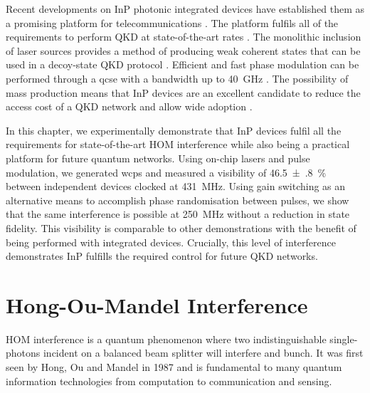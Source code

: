 Recent developments on \ac{InP} photonic integrated devices have established them as a promising platform for telecommunications \cite{smit2014}. The platform fulfils all of the requirements to perform \ac{QKD} at state-of-the-art rates \cite{Sibson2017InP}. The monolithic inclusion of laser sources provides a method of producing weak coherent states that can be used in a decoy-state QKD protocol \cite{Lo2005}. Efficient and fast phase modulation can be performed through a \ac{qcse} with a bandwidth up to \SI{40}{GHz} \cite{smit2014}. The possibility of mass production means that \ac{InP} devices are an excellent candidate to reduce the access cost of a \ac{QKD} network and allow wide adoption \cite{JeppixRoadmap}.

In this chapter, we experimentally demonstrate that \ac{InP} devices fulfil all the requirements for state-of-the-art \ac{HOM} interference while also being a practical platform for future quantum networks. Using on-chip lasers and pulse modulation, we generated \acp{wcp} and measured a visibility of \SI{46.5(8)}{\percent} between independent devices clocked at \SI{431}{MHz}. Using gain switching as an alternative means to accomplish phase randomisation between pulses, we show that the same interference is possible at \SI{250}{MHz} without a reduction in state fidelity. This visibility is comparable to other demonstrations \cite{Yuan2014, Rubenok2013, Comandar2016} with the benefit of being performed with integrated devices. Crucially, this level of interference demonstrates \ac{InP} fulfills the required control for future \ac{QKD} networks.


\section{Hong-Ou-Mandel Interference}

\Ac{HOM} interference is a quantum phenomenon where two indistinguishable single-photons incident on a balanced beam splitter will interfere and bunch. It was first seen by Hong, Ou and Mandel in 1987 \cite{HOM} and is fundamental to many quantum information technologies from computation to communication and sensing. 

